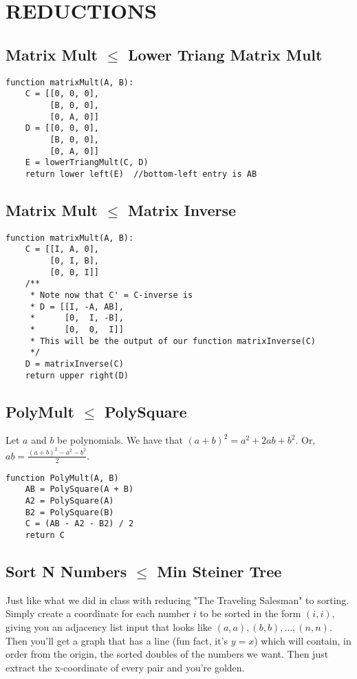 \documentclass[12pt]{article}
\providecommand{\reducible}[2]{
  \textbf{#1} $\leq$ \textbf{#2}
}
\begin{document}
\section{REDUCTIONS}
\subsection{\reducible{Matrix Mult}{Lower Triang Matrix Mult}}
\begin{lstlisting}
function matrixMult(A, B):
    C = [[0, 0, 0],
         [B, 0, 0],
         [0, A, 0]]
    D = [[0, 0, 0],
         [B, 0, 0],
         [0, A, 0]]
    E = lowerTriangMult(C, D)
    return lower left(E)  //bottom-left entry is AB
\end{lstlisting}


\subsection{\reducible{Matrix Mult}{Matrix Inverse}}
\begin{lstlisting}
function matrixMult(A, B):
    C = [[I, A, 0],
         [0, I, B],
         [0, 0, I]]
    /**
     * Note now that C' = C-inverse is
     * D = [[I, -A, AB],
     *      [0,  I, -B],
     *      [0,  0,  I]]
     * This will be the output of our function matrixInverse(C)
     */
    D = matrixInverse(C)
    return upper right(D)
\end{lstlisting}


\subsection{\reducible{PolyMult}{PolySquare}}
Let $a$ and $b$ be polynomials.
We have that $(a+b)^2 = a^2 + 2ab + b^2$.
Or, $\displaystyle ab = \frac{(a+b)^2 - a^2 - b^2}{2}$.\\
\begin{lstlisting}
function PolyMult(A, B)
    AB = PolySquare(A + B)
    A2 = PolySquare(A)
    B2 = PolySquare(B)
    C = (AB - A2 - B2) / 2
    return C
\end{lstlisting}

\subsection{\reducible{Sort N Numbers}{Min Steiner Tree}}
Just like what we did in class with reducing "The Traveling Salesman" to sorting.
Simply create a coordinate for each number $i$ to be sorted in the form $(i,i)$,
giving you an adjacency list input that looks like $(a,a),(b,b), \dots, (n,n)$.
Then you'll get a graph that has a line (fun fact, it's $y=x$) which will contain,
in order from the origin, the sorted doubles of the numbers we want.
Then just extract the x-coordinate of every pair and you're golden.
\end{document}

